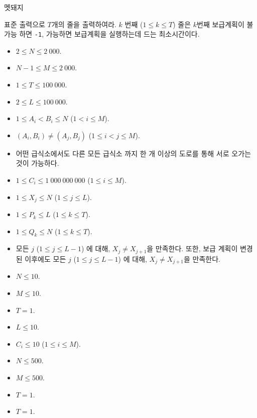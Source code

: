 \begin{problem}{멧돼지}
	\OutputFile
	
	표준 출력으로 $T$개의 줄을 출력하여라. $k$ 번째 ($1 \le k \le T$) 줄은 $k$번째 보급계획이 불가능 하면 \texttt{-1}, 가능하면 보급계획을 실행하는데 드는 최소시간이다.
	
	\Constraints
	
	\begin{itemize}
		\item $2 \le N \le 2\ 000$.
		\item $N-1 \le M \le 2\ 000$.
		\item $1 \le T \le 100\ 000$.
		\item $2 \le L \le 100\ 000$.
		\item $1 \le A_i < B_i \le N$ ($1 < i \le M$).
		\item $(A_i, B_i) \ne (A_j, B_j)$ ($1 \le i< j \le M$).
		\item 어떤 급식소에서도 다른 모든 급식소 까지 한 개 이상의 도로를 통해 서로 오가는 것이 가능하다.
		\item $1 \le C_i \le 1\ 000\ 000\ 000$ ($1 \le i \le M$).
		\item $1 \le X_j \le N$ ($1 \le j \le L$).
		\item $1 \le P_k \le L$ ($1 \le k \le T$).
		\item $1 \le Q_k \le N$ ($1 \le k \le T$).
		\item 모든 $j$ ($1 \le j \le L-1$) 에 대해, $X_j \ne X_{j+1}$을 만족한다. 또한, 보급 계획이 변경된 이후에도 모든 $j$ ($1 \le j \le L-1$) 에 대해, $X_j \ne X_{j+1}$을 만족한다.
	\end{itemize}
	
	
	\begin{itemize}
		\item $N \le 10$.
		\item $M \le 10$.
		\item $T = 1$.
		\item $L \le 10$.
		\item $C_i \le 10$ ($1 \le i \le M$).
	\end{itemize}


	\begin{itemize}
		\item $N \le 500$.
		\item $M \le 500$.
		\item $T = 1$.
	\end{itemize}


	\begin{itemize}
		\item $T = 1$.
	\end{itemize}
	

\end{problem}

